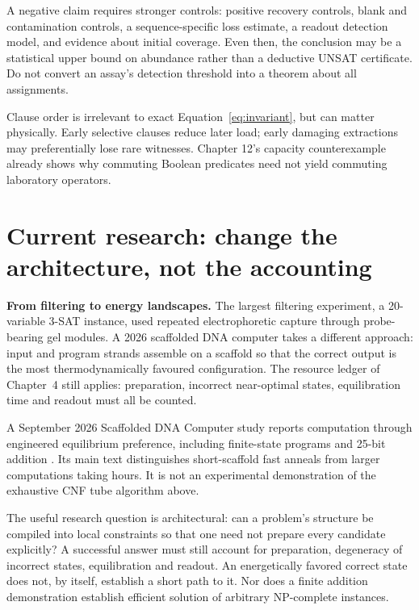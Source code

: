A negative claim requires stronger controls: positive recovery controls,
blank and contamination controls, a sequence-specific loss estimate,
a readout detection model, and evidence about initial coverage. Even then,
the conclusion may be a statistical upper bound on abundance rather than
a deductive UNSAT certificate. Do not convert an assay's detection threshold
into a theorem about all assignments.

Clause order is irrelevant to exact Equation~\ref{eq:invariant}, but can
matter physically. Early selective clauses reduce later load; early
damaging extractions may preferentially lose rare witnesses. Chapter 12's
capacity counterexample already shows why commuting Boolean predicates
need not yield commuting laboratory operators.

\section{Current research: change the architecture, not the accounting}
\begin{Frontier}
\textbf{From filtering to energy landscapes.} The largest filtering experiment,
a 20-variable 3-SAT instance, used repeated electrophoretic capture through
probe-bearing gel modules.\cite{Braich2002} A 2026 scaffolded DNA computer takes
a different approach: input and program strands assemble on a scaffold so that
the correct output is the most thermodynamically favoured
configuration.\cite{Sterin2026} The resource ledger of Chapter~4 still applies:
preparation, incorrect near-optimal states, equilibration time and readout must
all be counted.
\end{Frontier}

A September 2026 Scaffolded DNA Computer study reports computation through
engineered equilibrium preference, including finite-state programs and
25-bit addition \cite{Sterin2026}. Its main text distinguishes short-scaffold
fast anneals from larger computations taking hours. It is not an
experimental demonstration of the exhaustive CNF tube algorithm above.

The useful research question is architectural: can a problem's structure
be compiled into local constraints so that one need not prepare every
candidate explicitly? A successful answer must still account for
preparation, degeneracy of incorrect states, equilibration and readout.
An energetically favored correct state does not, by itself, establish a
short path to it. Nor does a finite addition demonstration establish
efficient solution of arbitrary NP-complete instances.


